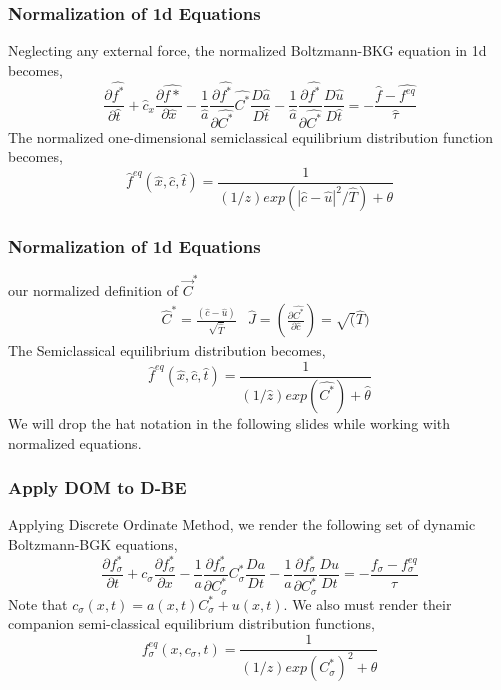 \documentclass[11pt,fleqn]{beamer}
\begin{document}
\begin{frame}
	\frametitle{Normalization of 1d Equations}
	Neglecting any external force, the normalized Boltzmann-BKG equation in 1d becomes,
	\begin{equation}
	\frac{\partial \hat {f^*}}{\partial \hat t} + \hat c_x \frac{\partial \hat {f*}}{\partial \hat x} 
		- \frac{1}{\hat a} \frac{\partial \hat {f^*}}{\partial \hat {C^*}} \hat {C^*} \frac{D \hat a}{D \hat t}
		- \frac{1}{\hat a} \frac{\partial \hat {f^*}}{\partial \hat {C^*}} \frac{D \hat u}{D \hat t}
		= -\frac{\hat f - \hat {f^{eq}}}{\hat \tau}
	\end{equation}
	The normalized one-dimensional semiclassical equilibrium distribution function becomes,
	\begin{equation}
	\hat f^{eq} (\hat x,\hat c,\hat t) = \frac{1}{(1/z) exp(\left | \hat c - \hat u \right |^2 / \hat T)+\theta}
\end{equation}
	
\end{frame}

\begin{frame}
	\frametitle{Normalization of 1d Equations}
	our normalized definition of $\vec{C}^*$ 
	\begin{align*}
	&\hat C^* = \frac{(\hat c-\hat u)}{\sqrt{\hat T}} & \hat J = \left(\frac{\partial \hat {C^*}}{\partial \hat c} \right ) = \sqrt(\hat T) 
	\end{align*}
	The Semiclassical equilibrium distribution becomes,
	\begin{equation}
	\hat f^{eq} (\hat x,\hat c,\hat t) = \frac{1}{(1/ \hat z) exp(\hat {C^*})+\hat \theta}
	\label{eq:normadistf1d}
	\end{equation}
	We will drop the hat notation in the following slides while working with normalized equations.
\end{frame}

\begin{frame}
	\frametitle{Apply DOM to D-BE}
	Applying Discrete Ordinate Method, we render the following set of dynamic Boltzmann-BGK equations,
	\begin{equation}
	\frac{\partial {f_\sigma^*}}{\partial t} + c_\sigma \frac{\partial f_\sigma^*}{\partial x} 
		- \frac{1}{a} \frac{\partial f_\sigma^*}{\partial C_\sigma^*} C_\sigma^* \frac{Da}{Dt}
		- \frac{1}{a} \frac{\partial f_\sigma^*}{\partial C_\sigma^*} \frac{Du}{Dt}
		= -\frac{f_\sigma - f_\sigma^{eq}}{\tau}
	\end{equation}
	Note that $c_\sigma(x,t) = a(x,t) C_\sigma^* + u(x,t)$. We also must render their companion semi-classical equilibrium distribution functions,
	\begin{equation}
	f_\sigma^{eq} (x,c_\sigma,t) = \frac{1}{(1/z) exp(C_\sigma^*)^2 + \theta}
	\end{equation}
	
\end{frame}
\end{document}
